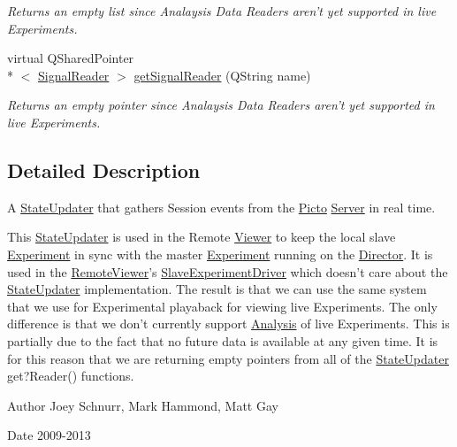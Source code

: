 \begin{DoxyCompactItemize}
\begin{DoxyCompactList}\small\item\em Returns an empty list since Analaysis Data Readers aren't yet supported in live Experiments. \end{DoxyCompactList}\item 
\hypertarget{class_picto_1_1_remote_state_updater_ad7f79399c5f0fd293cace5018319b58f}{virtual Q\-Shared\-Pointer\\*
$<$ \hyperlink{class_picto_1_1_signal_reader}{Signal\-Reader} $>$ \hyperlink{class_picto_1_1_remote_state_updater_ad7f79399c5f0fd293cace5018319b58f}{get\-Signal\-Reader} (Q\-String name)}\label{class_picto_1_1_remote_state_updater_ad7f79399c5f0fd293cace5018319b58f}

\begin{DoxyCompactList}\small\item\em Returns an empty pointer since Analaysis Data Readers aren't yet supported in live Experiments. \end{DoxyCompactList}\end{DoxyCompactItemize}


\subsection{Detailed Description}
A \hyperlink{class_picto_1_1_state_updater}{State\-Updater} that gathers Session events from the \hyperlink{namespace_picto}{Picto} \hyperlink{class_server}{Server} in real time. 

This \hyperlink{class_picto_1_1_state_updater}{State\-Updater} is used in the Remote \hyperlink{class_viewer}{Viewer} to keep the local slave \hyperlink{class_picto_1_1_experiment}{Experiment} in sync with the master \hyperlink{class_picto_1_1_experiment}{Experiment} running on the \hyperlink{class_director}{Director}. It is used in the \hyperlink{class_remote_viewer}{Remote\-Viewer}'s \hyperlink{class_picto_1_1_slave_experiment_driver}{Slave\-Experiment\-Driver} which doesn't care about the \hyperlink{class_picto_1_1_state_updater}{State\-Updater} implementation. The result is that we can use the same system that we use for Experimental playaback for viewing live Experiments. The only difference is that we don't currently support \hyperlink{class_picto_1_1_analysis}{Analysis} of live Experiments. This is partially due to the fact that no future data is available at any given time. It is for this reason that we are returning empty pointers from all of the \hyperlink{class_picto_1_1_state_updater}{State\-Updater} get?Reader() functions. \begin{DoxyAuthor}{Author}
Joey Schnurr, Mark Hammond, Matt Gay 
\end{DoxyAuthor}
\begin{DoxyDate}{Date}
2009-\/2013 
\end{DoxyDate}


